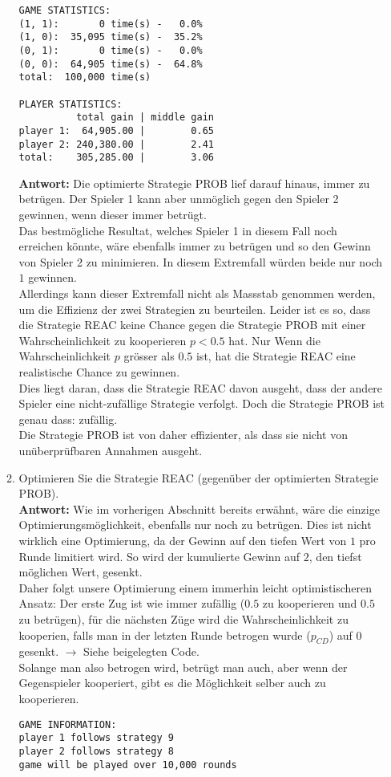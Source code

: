 \documentclass[12pt,a4paper]{article}
\begin{document}
\begin{enumerate}
\begin{enumerate}
\begin{verbatim}
GAME STATISTICS:
(1, 1):       0 time(s) -   0.0%
(1, 0):  35,095 time(s) -  35.2%
(0, 1):       0 time(s) -   0.0%
(0, 0):  64,905 time(s) -  64.8%
total:  100,000 time(s)

PLAYER STATISTICS:
          total gain | middle gain
player 1:  64,905.00 |        0.65
player 2: 240,380.00 |        2.41
total:    305,285.00 |        3.06
\end{verbatim}
\textbf{Antwort:} Die optimierte Strategie PROB lief darauf hinaus, immer zu betrügen. Der Spieler 1 kann aber unmöglich gegen den Spieler 2 gewinnen, wenn dieser immer betrügt.\\
Das bestmögliche Resultat, welches Spieler 1 in diesem Fall noch erreichen könnte, wäre ebenfalls immer zu betrügen und so den Gewinn von Spieler 2 zu minimieren.
In diesem Extremfall würden beide nur noch $1$ gewinnen.\\
Allerdings kann dieser Extremfall nicht als Massstab genommen werden, um die Effizienz der zwei Strategien zu beurteilen.
Leider ist es so, dass die Strategie REAC keine Chance gegen die Strategie PROB mit einer Wahrscheinlichkeit zu kooperieren $p < 0.5$ hat.
Nur Wenn die Wahrscheinlichkeit $p$ grösser als $0.5$ ist, hat die Strategie REAC eine realistische Chance zu gewinnen.\\
Dies liegt daran, dass die Strategie REAC davon ausgeht, dass der andere Spieler eine nicht-zufällige Strategie verfolgt.
Doch die Strategie PROB ist genau dass: zufällig.\\
Die Strategie PROB ist von daher effizienter, als dass sie nicht von unüberprüfbaren Annahmen ausgeht.
\newpage

\item Optimieren Sie die Strategie REAC (gegenüber der optimierten Strategie PROB).\\
\textbf{Antwort:} Wie im vorherigen Abschnitt bereits erwähnt, wäre die einzige Optimierungsmöglichkeit, ebenfalls nur noch zu betrügen.
Dies ist nicht wirklich eine Optimierung, da der Gewinn auf den tiefen Wert von $1$ pro Runde limitiert wird.
So wird der kumulierte Gewinn auf $2$, den tiefst möglichen Wert, gesenkt.\\
Daher folgt unsere Optimierung einem immerhin leicht optimistischeren Ansatz:
Der erste Zug ist wie immer zufällig ($0.5$ zu kooperieren und $0.5$ zu betrügen), für die nächsten Züge wird die Wahrscheinlichkeit zu kooperien,
falls man in der letzten Runde betrogen wurde ($p_{CD}$) auf $0$ gesenkt. $\rightarrow$ Siehe beigelegten Code.\\
Solange man also betrogen wird, betrügt man auch, aber wenn der Gegenspieler kooperiert, gibt es die Möglichkeit selber auch zu kooperieren.
\begin{verbatim}
GAME INFORMATION:
player 1 follows strategy 9
player 2 follows strategy 8
game will be played over 10,000 rounds


\end{verbatim}
\end{enumerate}
\end{enumerate}
\end{document}
